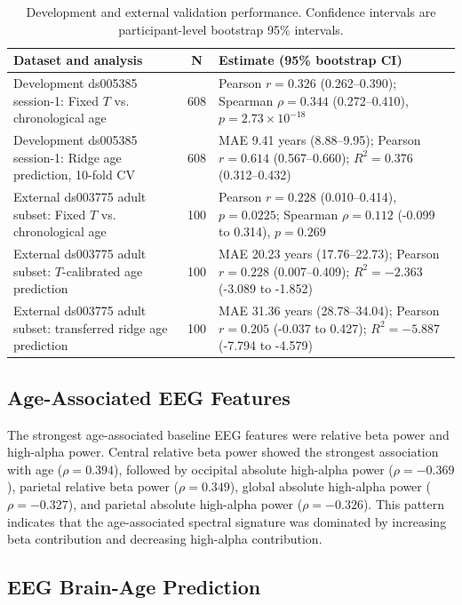 \documentclass[journal]{IEEEtran}
\begin{document}
\begin{table}[!t]
\centering
\caption{Development and external validation performance. Confidence intervals are participant-level bootstrap 95\% intervals.}
\label{tab:external_validation}
\footnotesize
\begin{tabular}{p{}cp{}}
\toprule
Dataset and analysis & N & Estimate (95\% bootstrap CI) \\
\midrule
Development ds005385 session-1: Fixed $T$ vs. chronological age & 608 & Pearson $r=0.326$ (0.262--0.390); Spearman $\rho=0.344$ (0.272--0.410), $p=2.73\times10^{-18}$ \\
Development ds005385 session-1: Ridge age prediction, 10-fold CV & 608 & MAE 9.41 years (8.88--9.95); Pearson $r=0.614$ (0.567--0.660); $R^2=0.376$ (0.312--0.432) \\
External ds003775 adult subset: Fixed $T$ vs. chronological age & 100 & Pearson $r=0.228$ (0.010--0.414), $p=0.0225$; Spearman $\rho=0.112$ (-0.099 to 0.314), $p=0.269$ \\
External ds003775 adult subset: $T$-calibrated age prediction & 100 & MAE 20.23 years (17.76--22.73); Pearson $r=0.228$ (0.007--0.409); $R^2=-2.363$ (-3.089 to -1.852) \\
External ds003775 adult subset: transferred ridge age prediction & 100 & MAE 31.36 years (28.78--34.04); Pearson $r=0.205$ (-0.037 to 0.427); $R^2=-5.887$ (-7.794 to -4.579) \\
\bottomrule
\end{tabular}
\end{table}

\subsection{Age-Associated EEG Features}

The strongest age-associated baseline EEG features were relative beta power and high-alpha power. Central relative beta power showed the strongest association with age ($\rho=0.394$), followed by occipital absolute high-alpha power ($\rho=-0.369$), parietal relative beta power ($\rho=0.349$), global absolute high-alpha power ($\rho=-0.327$), and parietal absolute high-alpha power ($\rho=-0.326$). This pattern indicates that the age-associated spectral signature was dominated by increasing beta contribution and decreasing high-alpha contribution.

\subsection{EEG Brain-Age Prediction}
\end{document}
